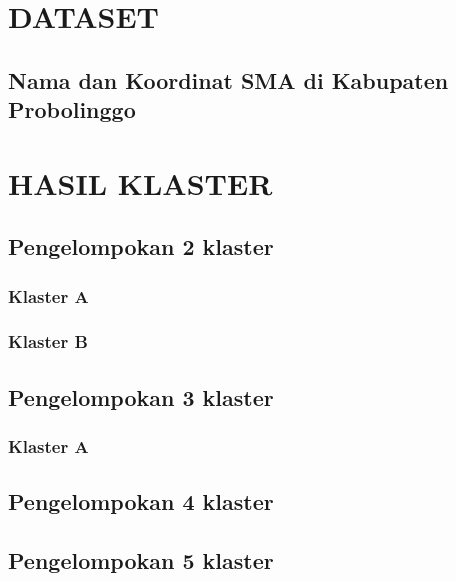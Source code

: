 \newpage
\thispagestyle{empty}
\appendix
\renewcommand{\thechapter}{\arabic{chapter}}
\renewcommand{\thesection}{\thechapter.\arabic{section}}
\renewcommand{\thesubsection}{\thechapter.\arabic{section}.\arabic{subsection}}
\chapter{DATASET}
\label{lampiran1}
\section{Nama dan Koordinat SMA di Kabupaten Probolinggo}



\chapter{HASIL KLASTER}
\label{lampiran2}

\section{Pengelompokan 2 klaster}

\subsection{Klaster A}


\subsection{Klaster B}


\section{Pengelompokan 3 klaster}

\subsection{Klaster A}


\section{Pengelompokan 4 klaster}
\section{Pengelompokan 5 klaster}
